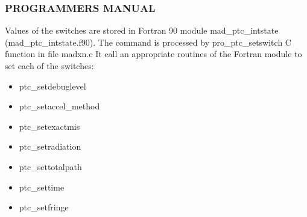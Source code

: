 


\subsubsection{ PROGRAMMERS MANUAL }   Values of the switches are stored in Fortran 90 module mad\_ptc\_intstate (mad\_ptc\_intstate.f90). The command is processed by pro\_ptc\_setswitch C function in file madxn.c It call an appropriate routines of the Fortran module to set each of the switches: 
\begin{itemize}
	\item  ptc\_setdebuglevel 
	\item  ptc\_setaccel\_method 
	\item  ptc\_setexactmis 
	\item  ptc\_setradiation 
	\item  ptc\_settotalpath 
	\item  ptc\_settime 
	\item  ptc\_setfringe  
\end{itemize}

